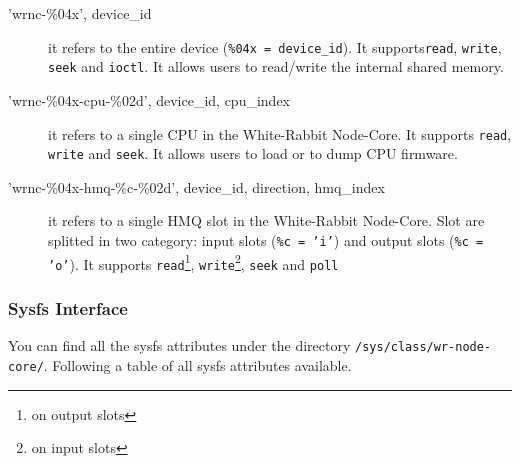 \documentclass[a4paper,10pt]{article}
\begin{document}
\begin{description}
 \item['wrnc-\%04x', device\_id] it refers to the entire device 
(\texttt{\%04x = device\_id}). It supports\texttt{read}, 
\texttt{write}, \texttt{seek} and \texttt{ioctl}. It allows users to 
read/write the internal shared memory.
 
 \item['wrnc-\%04x-cpu-\%02d', device\_id, cpu\_index] it refers to a 
single CPU in the
 White-Rabbit Node-Core. It supports \texttt{read}, \texttt{write} and 
\texttt{seek}. It allows users to load or to dump CPU firmware.
 
 \item['wrnc-\%04x-hmq-\%c-\%02d', device\_id, direction, hmq\_index] 
it refers to a single HMQ slot in
the White-Rabbit Node-Core. Slot are splitted in two category: input 
slots (\texttt{\%c = 'i'}) and output slots (\texttt{\%c = 'o'}). It 
supports \texttt{read}\footnote{on output slots}, 
\texttt{write}\footnote{on input slots}, \texttt{seek} and 
\texttt{poll}
\end{description}

\subsubsection{Sysfs Interface}
You can find all the sysfs attributes under the directory 
\texttt{/sys/class/wr-node-core/}. Following a table of all sysfs 
attributes available.
\end{document}
